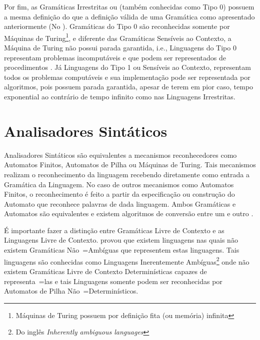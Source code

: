 {    Por fim,
    as Gramáticas Irrestritas ou (também conhecidas como Tipo 0) possuem a mesma definição do
    que a definição válida de uma Gramática como apresentado anteriormente (No
    ).
    Gramáticas do Tipo 0 são reconhecidas somente por Máquinas de Turing\footnote{Máquinas
    de Turing possuem por definição fita (ou memória) infinita
    },
    e diferente das Gramáticas Sensíveis ao Contexto,
    a Máquina de Turing não possui parada garantida,
    i.e.,
    Linguagens do Tipo 0 representam problemas incomputáveis e
    que podem ser representados de procedimentos \cite{sipserBook}.
    Já Linguagens do Tipo 1 ou Sensíveis ao Contexto,
    representam todos os problemas computáveis e
    sua implementação pode ser representada por algoritmos,
    pois possuem parada garantida,
    apesar de terem em pior caso,
    tempo exponential ao contrário de tempo infinito como nas Linguagens Irrestritas.


\section{Analisadores Sintáticos}
\label{analisadoresSintaticos}

    Analisadores Sintáticos são equivalentes a mecanismos reconhecedores como Automatos Finitos,
    Automatos de Pilha ou Máquinas de Turing.
    Tais mecanismos realizam o reconhecimento da linguagem recebendo
    diretamente como entrada a Gramática da Linguagem.
    No caso de outros mecanismos como Automatos Finitos,
    o reconhecimento é feito a partir da especificação ou construção
    do Automato que reconhece palavras de dada linguagem.
    Ambos Gramáticas e
    Automatos são equivalentes e
    existem algoritmos de conversão entre um e
    outro \cite{hopcroftBook}.

    É importante fazer a distinção entre Gramáticas Livre de Contexto e
    as Linguagens Livre de Contexto.
     provou que existem linguagens nas quais não
    existem Gramáticas Não~=Ambíguas que representem estas linguagens.
    Tais linguagens são conhecidas como Linguagens Inerentemente Ambíguas\footnote{Do
    inglês \textit{Inherently ambiguous languages}} onde não existem Gramáticas
    Livre de Contexto Determinísticas capazes de representa~=las e
    tais Linguagens somente podem ser reconhecidas por Automatos de Pilha Não~=Determinísticos.

}
